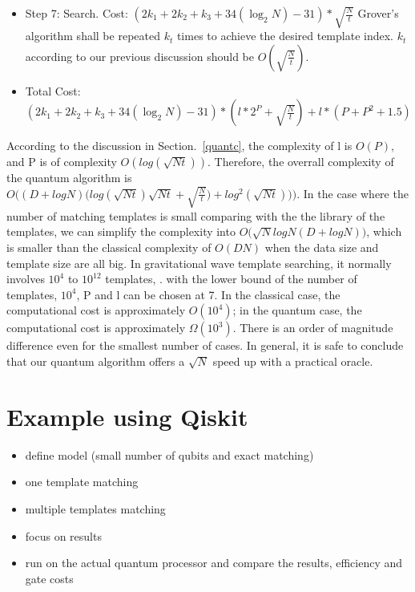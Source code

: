 \documentclass[aps,prd,nofootinbib,twocolumn,reprint,superscriptaddress,showpacs,showkeys,longbibliography]{revtex4-1}
\begin{document}
\begin{itemize}
\begin{itemize}
        \end{itemize}
    \item Step 7: Search. Cost: $(2k_1+2k_2+k_3+34(\log_2 N)-31)*\sqrt{\frac{N}{t}}$
    \newline Grover's algorithm shall be repeated $k_t$ times to achieve the desired template index. $k_t$ according to our previous discussion should be $O(\sqrt{\frac{N}{t}})$.
    \item Total Cost: $(2k_1+2k_2+k_3+34(\log_2 N)-31)*(l*2^{P}+\sqrt{\frac{N}{t}})+l*(P+P^2+1.5)$
\end{itemize}
According to the discussion in Section.~\ref{quantc}, the complexity of l is $O(P)$, and P is of complexity  $O(log(\sqrt{Nt}))$. Therefore, the overrall complexity of the quantum algorithm is $O\Big((D+logN)\big(log(\sqrt{Nt})\sqrt{Nt}+\sqrt{\frac{N}{t}}\big)+log^2(\sqrt{Nt}))\Big)$. In the case where the number of matching templates is small comparing with the the library of the templates, we can simplify the complexity into $O\big(\sqrt {N} logN(D+logN)\big)$, which is smaller than the classical complexity of $O(DN)$ when the data size and template size are all big. In gravitational wave template searching, it normally involves $10^4$ to $10^{12}$ templates, . with the lower bound of the number of templates, $10^4$, P and l can be chosen at 7. In the classical case, the computational cost is approximately $O(10^4)$; in the quantum case, the computational cost is approximately $\Omega(10^3)$. There is an order of magnitude difference even for the smallest number of cases. In general, it is safe to conclude that our quantum algorithm offers a $\sqrt{N}$ speed up with a practical oracle.



\section{Example using Qiskit}\label{sec:qizkitexample}

\begin{itemize}
\item define model (small number of qubits and exact matching)
\item one template matching
\item multiple templates matching
\item focus on results
\item run on the actual quantum processor and compare the results, efficiency and gate costs
\end{itemize}
\end{document}
